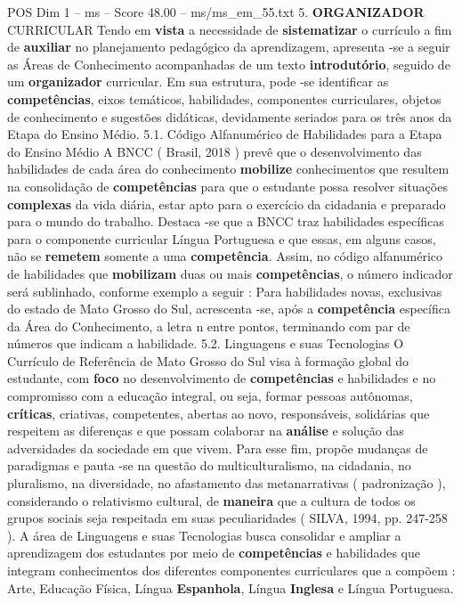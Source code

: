 \begin{textsample}{POS Dim 1 – ms – Score 48.00 – ms/ms\_em\_55.txt}  \label{ex:f1_pos_185}
5. \textbf{ORGANIZADOR} CURRICULAR Tendo em \textbf{vista} a necessidade de \textbf{sistematizar} o currículo a fim de \textbf{auxiliar} no planejamento pedagógico da aprendizagem, apresenta -se a seguir as Áreas de Conhecimento acompanhadas de um texto \textbf{introdutório}, seguido de um \textbf{organizador} curricular.
Em sua estrutura, pode -se identificar as \textbf{competências}, eixos temáticos, habilidades, componentes curriculares, objetos de conhecimento e sugestões didáticas, devidamente seriados para os três anos da Etapa do Ensino Médio. 5.1.
Código Alfanumérico de Habilidades para a Etapa do Ensino Médio A BNCC ( Brasil, 2018 ) prevê que o desenvolvimento das habilidades de cada área do conhecimento \textbf{mobilize} conhecimentos que resultem na consolidação de \textbf{competências} para que o estudante possa resolver situações \textbf{complexas} da vida diária, estar apto para o exercício da cidadania e preparado para o mundo do trabalho.
Destaca -se que a BNCC traz habilidades específicas para o componente curricular Língua Portuguesa e que essas, em alguns casos, não se \textbf{remetem} somente a uma \textbf{competência}.
Assim, no código alfanumérico de habilidades que \textbf{mobilizam} duas ou mais \textbf{competências}, o número indicador será sublinhado, conforme exemplo a seguir : Para habilidades novas, exclusivas do estado de Mato Grosso do Sul, acrescenta -se, após a \textbf{competência} específica da Área do Conhecimento, a letra n entre pontos, terminando com par de números que indicam a habilidade. 5.2.
Linguagens e suas Tecnologias O Currículo de Referência de Mato Grosso do Sul visa à formação global do estudante, com \textbf{foco} no desenvolvimento de \textbf{competências} e habilidades e no compromisso com a educação integral, ou seja, formar pessoas autônomas, \textbf{críticas}, criativas, competentes, abertas ao novo, responsáveis, solidárias que respeitem as diferenças e que possam colaborar na \textbf{análise} e solução das adversidades da sociedade em que vivem.
Para esse fim, propõe mudanças de paradigmas e pauta -se na questão do multiculturalismo, na cidadania, no pluralismo, na diversidade, no afastamento das metanarrativas ( padronização ), considerando o relativismo cultural, de \textbf{maneira} que a cultura de todos os grupos sociais seja respeitada em suas peculiaridades ( SILVA, 1994, pp. 247-258 ).
A área de Linguagens e suas Tecnologias busca consolidar e ampliar a aprendizagem dos estudantes por meio de \textbf{competências} e habilidades que integram conhecimentos dos diferentes componentes curriculares que a compõem : Arte, Educação Física, Língua \textbf{Espanhola}, Língua \textbf{Inglesa} e Língua Portuguesa.

\end{textsample}
